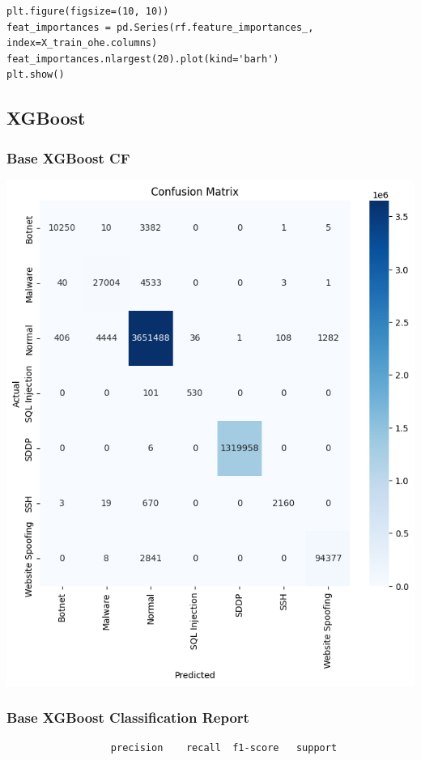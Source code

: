 \begin{appendices}
\begin{lstlisting}
plt.figure(figsize=(10, 10))
feat_importances = pd.Series(rf.feature_importances_, index=X_train_ohe.columns)
feat_importances.nlargest(20).plot(kind='barh')
plt.show()
\end{lstlisting}

\subsection{XGBoost}

\subsubsection{Base XGBoost CF}
\includegraphics[width=\textwidth]{Appendices/Base_XGB_CF.png}
\newpage

\subsubsection{Base XGBoost Classification Report}
\begin{lstlisting}
                  precision    recall  f1-score   support


\end{lstlisting}
\end{appendices}
